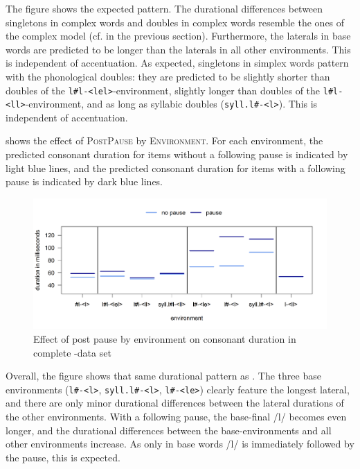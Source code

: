  The figure shows the expected pattern. The durational differences between singletons in complex words and doubles in complex words resemble the ones of the complex model (cf.  in the previous section). 
 Furthermore, the laterals in base words are predicted to be longer than the laterals in all other environments. This is independent of accentuation. 
 As expected, singletons in simplex words pattern with the phonological doubles: they are predicted to be slightly shorter than doubles of the \texttt{l\#l-<lel>}-environment, slightly longer than doubles of the \texttt{l\#l-<ll>}-environment, and as long as syllabic doubles (\texttt{syll.l\#-<l>}). This is independent of accentuation.
 
 
 
  shows the effect of \textsc{PostPause} by \textsc{Environment}. For each environment, the predicted consonant duration for items without a following pause is indicated by light blue lines, and the predicted consonant duration for  items with a following pause is indicated by dark blue lines.

 \begin{figure} [h!]
 	\centering

 	\includegraphics [scale=0.48] {images/Experiment/LyModelCompleteInterEnvPauseLines}

 	\caption{Effect of  post pause by environment on consonant duration in complete -data set}
 	\label{fig:Env pause lyComplete experiment}

 \end{figure}
 

 Overall, the figure shows that same durational pattern as . The three base environments (\texttt{l\#-<l>}, \texttt{syll.l\#-<l>}, \texttt{l\#-<le>}) clearly feature the longest lateral, and there are only minor durational differences between the lateral durations of the other environments. 
 With a following pause, the base-final /l/ becomes even longer, and the durational differences between the base-environments and all other environments increase. As only in base words /l/ is immediately followed by the pause, this is expected. 



